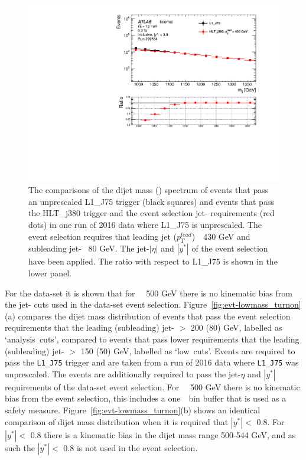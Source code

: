 \begin{figure}[!ht]
  \begin{center}
    \includegraphics[width=0.6\linewidth, angle=0]{figs/Dibjet/HighMass/evt-mjj.pdf}
  \end{center}
  \caption{The comparisons of the dijet mass (\mjj{}) spectrum of events that pass an unprescaled L1\_J75 trigger (black squares)
    and events that pass the  HLT\_j380 trigger and the \hm{} event selection jet-\pT{} requirements (red dots)
    in one run of 2016 data where L1\_J75 is unprescaled.
    The \hm{} event selection requires that leading jet \pT{} ($p_T^{lead}$)~\gt~430 GeV and subleading jet-\pT{} \gt~80 GeV.
    The jet-$|\eta|$ and $|y^*|$ of the \hm{} event selection have been applied.
    The ratio with respect to L1\_J75 is shown in the lower panel.}
     \label{fig:evt-hm_turnon}
\end{figure}

For the \lm{} data-set it is shown that for \mjj~\gt~500 GeV there is no kinematic bias
from the jet-\pT{} cuts used in the \lm{} data-set event selection.
Figure~\ref{fig:evt-lowmass_turnon}(a) compares the dijet mass distribution of events
that pass the event selection requirements that the leading (subleading) jet-\pT{} $>$ 200 (80) GeV, labelled as `analysis~cuts',
compared to events that pass lower requirements that the leading (subleading) jet-\pT{} $>$ 150 (50) GeV, labelled as `low~cuts'.
Events are required to pass the \verb|L1_J75| trigger and are taken from a run of 2016 data where \verb|L1_J75| was unprescaled.
The events are additionally required to pass the jet-$\eta$ and $|y^*|$ requirements of the \lm{} data-set event selection.
For \mjj~\gt~500 GeV there is no kinematic bias from the \lm{} event selection,
this includes a one~\mjj~bin buffer that is used as a safety measure.
Figure~\ref{fig:evt-lowmass_turnon}(b) shows an identical comparison of  dijet mass distribution
when it is required that $|y^*| <$ 0.8.
For $|y^*| <$ 0.8 there is a kinematic bias in the dijet mass range 500-544 GeV,
and as such the $|y^*| <$ 0.8 is not used in the event selection.

